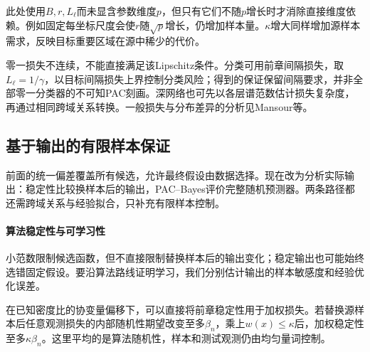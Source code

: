 此处使用$B,r,L_{\ell}$而未显含参数维度$p$，但只有它们不随$p$增长时才消除直接维度依赖。例如固定每坐标尺度会使$r$随$\sqrt p$增长，仍增加样本量。$\kappa$增大同样增加源样本需求，反映目标重要区域在源中稀少的代价。

零一损失不连续，不能直接满足该Lipschitz条件。分类可用前章间隔损失，取$L_{\ell}=1/\gamma$，以目标间隔损失上界控制分类风险；得到的保证保留间隔要求，并非全部零一分类器的不可知PAC刻画。深网络也可先以各层谱范数估计损失复杂度，再通过相同跨域关系转换。一般损失与分布差异的分析见Mansour等。

\subsection{基于输出的有限样本保证}
\label{sec:transfer-stability}
\label{sec:adaptation-output-bounds}

前面的统一偏差覆盖所有候选，允许最终假设由数据选择。现在改为分析实际输出：稳定性比较换样本后的输出，PAC--Bayes评价完整随机预测器。两条路径都还需跨域关系与经验拟合，只补充有限样本控制。

\paragraph{算法稳定性与可学习性}

小范数限制候选函数，但不直接限制替换样本后的输出变化；稳定输出也可能始终选错固定假设。要沿算法路线证明学习，我们分别估计输出的样本敏感度和经验优化误差。

在已知密度比的协变量偏移下，可以直接将前章稳定性用于加权损失。若替换源样本后任意观测损失的内部随机性期望改变至多$\beta_n$，乘上$w(x)\leq\kappa$后，加权稳定性至多$\kappa\beta_n$。这里平均的是算法随机性，样本和测试观测仍由均匀量词控制。

